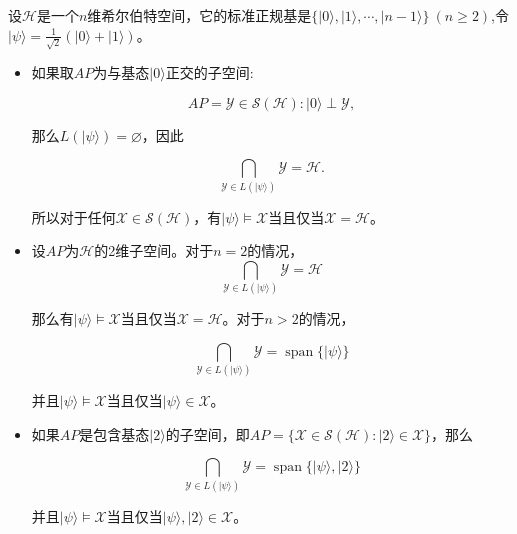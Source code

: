 \begin{example}\citep{2021}
    设$\mathcal{H}$是一个$n$维希尔伯特空间，它的标准正规基是$\{|0\rangle, |1\rangle, \cdots, |n - 1\rangle\}\ (n \geq 2)$,令$|\psi\rangle = \frac{1}{\sqrt{2}}(|0\rangle + |1\rangle)$。
    \begin{itemize}
        \item 如果取$AP$为与基态$|0\rangle$正交的子空间:

        \begin{equation}
        AP = {\mathcal{Y} \in \mathcal{S}(\mathcal{H}) : |0\rangle \perp \mathcal{Y}},
        \end{equation}
        
        那么$L(|\psi\rangle) = \varnothing$，因此
        
        \begin{equation}
        {\bigcap_{\mathcal{Y} \in L(|\psi\rangle)} \mathcal{Y} = \mathcal{H}.}
        \end{equation}
        
        所以对于任何$\mathcal{X} \in \mathcal{S}(\mathcal{H})$，有$|\psi\rangle \models \mathcal{X}$当且仅当$\mathcal{X} = \mathcal{H}$。
        
        \item 设$AP$为$\mathcal{H}$的2维子空间。对于$n = 2$的情况，
        \begin{equation}
            {\bigcap_{\mathcal{Y} \in L(|\psi\rangle)} \mathcal{Y} = \mathcal{H}}
            \end{equation}
            
            那么有$|\psi\rangle \models \mathcal{X}$当且仅当$\mathcal{X} = \mathcal{H}$。对于$n > 2$的情况，
            
            \begin{equation}
            {\bigcap_{\mathcal{Y} \in L(|\psi\rangle)} \mathcal{Y} = \operatorname{span}\{|\psi\rangle}\}
            \end{equation}
            
            并且$|\psi\rangle \models \mathcal{X}$当且仅当$|\psi\rangle \in \mathcal{X}$。
            
        \item 如果$AP$是包含基态$|2\rangle$的子空间，即$AP = \{\mathcal{X} \in \mathcal{S}(\mathcal{H}) : |2\rangle \in \mathcal{X}\}$，那么
            
            \begin{equation}
            {\bigcap_{\mathcal{Y} \in L(|\psi\rangle)} \mathcal{Y} = \operatorname{span}\{|\psi\rangle, |2\rangle}\}
            \end{equation}
            
            并且$|\psi\rangle \models \mathcal{X}$当且仅当$|\psi\rangle,|2\rangle \in \mathcal{X}$。
    \end{itemize}

\end{example}
